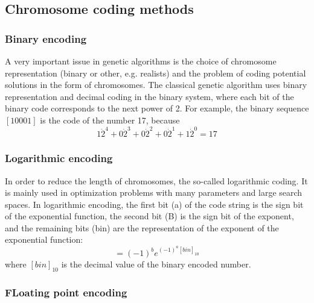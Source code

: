 \subsection{Chromosome coding methods} 

\subsubsection{Binary encoding}
A very important issue in genetic algorithms is the choice of chromosome representation 
(binary or other, e.g. realists) and the problem of coding potential solutions in the 
form of chromosomes. 
The classical genetic algorithm uses binary representation and decimal coding in the 
binary system, where each bit of the binary code corresponds to the next power of 2. 
For example, the binary sequence $[10001]$ is the code of the number 17, because
\begin{equation}
	1\dot 2^4 + 0\dot 2^3 + 0 \dot 2^2 + 0\dot 2^1 + 1\dot 2^0 = 17
\end{equation}

\subsubsection{Logarithmic encoding}
In order to reduce the length of chromosomes, the so-called logarithmic coding. 
It is mainly used in optimization problems with many parameters and large search spaces. 
In logarithmic encoding, the first bit (a) of the code string is the sign bit of the 
exponential function, the second bit (B) is the sign bit of the exponent, 
and the remaining bits (bin) are the representation of the exponent of the exponential function:
\begin{equation}
	[a\dot b\dot bin] = (-1)^b e^{(-1)^{a}[bin]_{10}}
\end{equation}
where $[bin]_{10}$ is the decimal value of the binary encoded number. 

\subsubsection{FLoating point encoding}

\FloatBarrier
